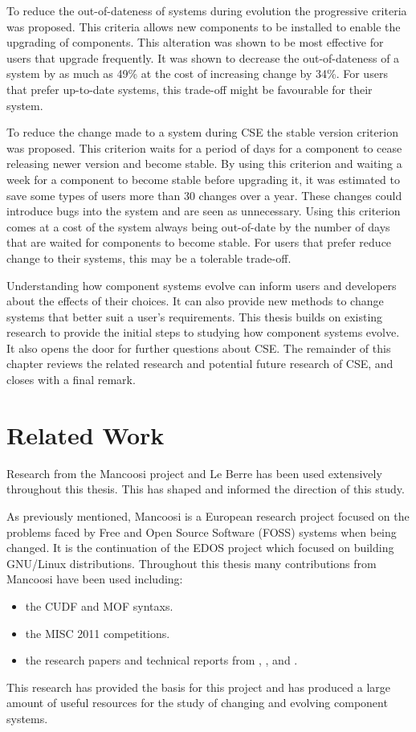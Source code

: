 To reduce the out-of-dateness of systems during evolution the progressive criteria was proposed.
This criteria allows new components to be installed to enable the upgrading of components.
This alteration was shown to be most effective for users that upgrade frequently.
It was shown to decrease the out-of-dateness of a system by as much as 49\% at the cost of increasing change by 34\%.
For users that prefer up-to-date systems, this trade-off might be favourable for their system.

To reduce the change made to a system during CSE the stable version criterion was proposed.
This criterion waits for a period of days for a component to cease releasing newer version and become stable.
By using this criterion and waiting a week for a component to become stable before upgrading it, it was estimated to save some types of users more than 30 changes over a year.
These changes could introduce bugs into the system and are seen as unnecessary. 
Using this criterion comes at a cost of the system always being out-of-date by the number of days that are waited for components to become stable.
For users that prefer reduce change to their systems, this may be a tolerable trade-off.

Understanding how component systems evolve can inform users and developers about the effects of their choices.
It can also provide new methods to change systems that better suit a user's requirements.
This thesis builds on existing research to provide the initial steps to studying how component systems evolve.
It also opens the door for further questions about CSE.
The remainder of this chapter reviews the related research and potential future research of CSE, and closes with a final remark. 


\section{Related Work}
Research from the Mancoosi project and Le Berre has been used extensively throughout this thesis.
This has shaped and informed the direction of this study.

As previously mentioned,
Mancoosi is a European research project focused on the problems faced by Free and Open Source Software (FOSS) systems when being changed.
It is the continuation of the EDOS project which focused on building GNU/Linux distributions.
Throughout this thesis many contributions from Mancoosi have been used including:
\begin{itemize}
  \item the CUDF \citep{treinen2009common} and MOF syntaxs.
  \item the MISC 2011 competitions.
  \item the research papers and technical reports from \cite{abatetrenen2010}, \cite{Treinen2009}, \cite{argelich2010solving} and \cite{abate2011}.
\end{itemize} 
This research has provided the basis for this project and has produced a large amount of useful resources for the study of changing and evolving component systems. 

